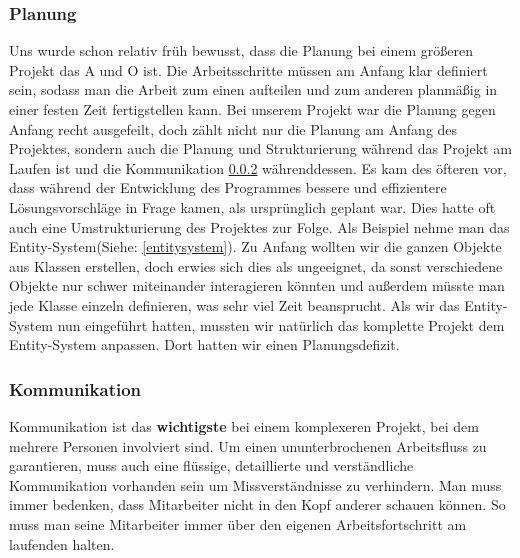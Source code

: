 \subsubsection{Planung}
Uns wurde schon relativ früh bewusst, dass die Planung bei einem größeren Projekt das A und O ist. Die Arbeitsschritte müssen am Anfang klar definiert sein, sodass man die Arbeit zum einen aufteilen und zum anderen planmäßig in einer festen Zeit fertigstellen kann. Bei unserem Projekt war die Planung gegen Anfang recht ausgefeilt, doch zählt nicht nur die Planung am Anfang des Projektes, sondern auch die Planung und Strukturierung während das Projekt am Laufen ist und die Kommunikation \ref{kommunikation} währenddessen. Es kam des öfteren vor, dass während der Entwicklung des Programmes bessere und effizientere Lösungsvorschläge in Frage kamen, als ursprünglich geplant war. Dies hatte oft auch eine Umstrukturierung des Projektes zur Folge. Als Beispiel nehme man das Entity-System(Siehe: \ref{entitysystem}). Zu Anfang wollten wir die ganzen Objekte aus Klassen erstellen, doch erwies sich dies als ungeeignet, da sonst verschiedene Objekte nur schwer miteinander interagieren könnten und außerdem müsste man jede Klasse einzeln definieren, was sehr viel Zeit beansprucht. 
Als wir das Entity-System nun eingeführt hatten, mussten wir natürlich das komplette Projekt dem Entity-System anpassen. Dort hatten wir einen Planungsdefizit.
                                                                                      
\subsubsection{Kommunikation}
\label{kommunikation}
Kommunikation ist das \textbf{wichtigste} bei einem komplexeren Projekt, bei dem mehrere Personen involviert sind. Um einen ununterbrochenen Arbeitsfluss zu garantieren, muss auch eine flüssige, detaillierte und verständliche Kommunikation vorhanden sein um Missverständnisse zu verhindern. Man muss immer bedenken, dass Mitarbeiter nicht in den Kopf anderer schauen können. So muss man seine Mitarbeiter immer über den eigenen Arbeitsfortschritt am laufenden halten.

